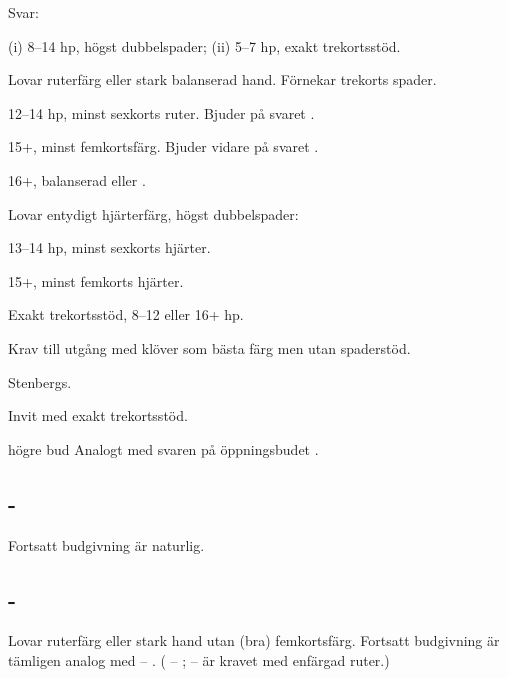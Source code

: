 Svar:
\begin{beskriv}

   \item[\NT{1}] (i) 8--14 hp, h\"ogst dubbelspader; (ii) 5--7 hp, exakt
     trekortsstöd. 
   \item[\kl{2}] Lovar ruterf\"arg eller stark balanserad hand. Förnekar
     trekorts spader.
         \begin{nummer}
           \item 12--14 hp, minst sexkorts ruter.
                 Bjuder  p{\aa} svaret .
           \item 15+, minst femkortsf{\"a}rg.
                      Bjuder vidare p{\aa} svaret .
	   \item 16+, balanserad eller .
          \end{nummer}

   \item[\ru{2}] Lovar entydigt hj\"arterf\"arg, högst dubbelspader:
          \begin{nummer}
            \item 13--14 hp, minst sexkorts hj{\"a}rter.
            \item 15+, minst femkorts hj{\"a}rter.
           \end{nummer}

   \item[\hj{2}] Exakt trekortsstöd, 8--12 eller 16+ hp. 

   \item[\spa{2}] Krav till utgång med klöver som bästa färg men utan
     spaderstöd. 

   \item[\NT{2}] Stenbergs.
   \item[\kl{3}] Invit med exakt trekortsstöd.
   \item[h\"ogre bud] Analogt med svaren p{\aa} \"oppningsbudet .
\end{beskriv}

\subsection{ - }

Fortsatt budgivning är naturlig.


\subsection{ - }

Lovar ruterfärg eller stark hand utan (bra) femkortsfärg.
Fortsatt budgivning är tämligen analog med  -- . ( --
;  --  är kravet med enfärgad ruter.) 

